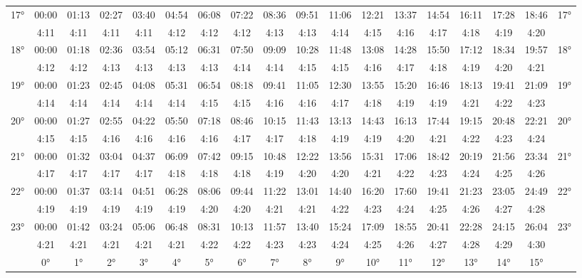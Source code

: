 \begin{scriptsize}
\begin{tabular}{c || c | c | c | c | c | c | c | c | c | c | c | c | c | c | c | c || c}
		\multirow{2}{*}{17°}&00:00&01:13&02:27&03:40&04:54&06:08&07:22&08:36&09:51&11:06&12:21&13:37&14:54&16:11&17:28&18:46&\multirow{2}{*}{17°}\\ \space&4:11&4:11&4:11&4:11&4:12&4:12&4:12&4:13&4:13&4:14&4:15&4:16&4:17&4:18&4:19&4:20&\space\\\hline
		\multirow{2}{*}{18°}&00:00&01:18&02:36&03:54&05:12&06:31&07:50&09:09&10:28&11:48&13:08&14:28&15:50&17:12&18:34&19:57&\multirow{2}{*}{18°}\\ \space&4:12&4:12&4:13&4:13&4:13&4:13&4:14&4:14&4:15&4:15&4:16&4:17&4:18&4:19&4:20&4:21&\space\\\hline
		\multirow{2}{*}{19°}&00:00&01:23&02:45&04:08&05:31&06:54&08:18&09:41&11:05&12:30&13:55&15:20&16:46&18:13&19:41&21:09&\multirow{2}{*}{19°}\\ \space&4:14&4:14&4:14&4:14&4:14&4:15&4:15&4:16&4:16&4:17&4:18&4:19&4:19&4:21&4:22&4:23&\space\\\hline
		\multirow{2}{*}{20°}&00:00&01:27&02:55&04:22&05:50&07:18&08:46&10:15&11:43&13:13&14:43&16:13&17:44&19:15&20:48&22:21&\multirow{2}{*}{20°}\\ \space&4:15&4:15&4:16&4:16&4:16&4:16&4:17&4:17&4:18&4:19&4:19&4:20&4:21&4:22&4:23&4:24&\space\\\hline
		\multirow{2}{*}{21°}&00:00&01:32&03:04&04:37&06:09&07:42&09:15&10:48&12:22&13:56&15:31&17:06&18:42&20:19&21:56&23:34&\multirow{2}{*}{21°}\\ \space&4:17&4:17&4:17&4:17&4:18&4:18&4:18&4:19&4:20&4:20&4:21&4:22&4:23&4:24&4:25&4:26&\space\\\hline
		\multirow{2}{*}{22°}&00:00&01:37&03:14&04:51&06:28&08:06&09:44&11:22&13:01&14:40&16:20&17:60&19:41&21:23&23:05&24:49&\multirow{2}{*}{22°}\\ \space&4:19&4:19&4:19&4:19&4:19&4:20&4:20&4:21&4:21&4:22&4:23&4:24&4:25&4:26&4:27&4:28&\space\\\hline
		\multirow{2}{*}{23°}&00:00&01:42&03:24&05:06&06:48&08:31&10:13&11:57&13:40&15:24&17:09&18:55&20:41&22:28&24:15&26:04&\multirow{2}{*}{23°}\\ \space&4:21&4:21&4:21&4:21&4:21&4:22&4:22&4:23&4:23&4:24&4:25&4:26&4:27&4:28&4:29&4:30&\space\\\hline
		\hline\space &0°&1°&2°&3°&4°&5°&6°&7°&8°&9°&10°&11°&12°&13°&14°&15°
\end{tabular}\end{scriptsize}

